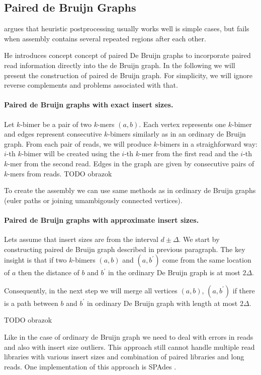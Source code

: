 \subsection{Paired de Bruijn Graphs}

\citet{Paired} argues that heuristic postprocessing
usually works well is simple cases, but fails when assembly contains
several repeated regions after each other.

He introduces concept concept of paired De Bruijn graphs to incorporate paired read
information directly into the de Bruijn graph.
In the following we will present the construction of 
paired de Bruijn graph.
For simplicity, we will ignore reverse complements and problems associated with that.

\paragraph{Paired de Bruijn graphs with exact insert sizes.}
Let $k$-bimer be a pair of two $k$-mers $(a, b)$. Each vertex 
represents one $k$-bimer and edges represent
consecutive $k$-bimers similarly as in an ordinary de Bruijn graph. 
From each pair of reads, we will produce $k$-bimers in a straighforward way:
$i$-th $k$-bimer will be created using the $i$-th $k$-mer from the first read and 
the $i$-th $k$-mer from the second read.
Edges in the graph are given by consecutive pairs of $k$-mers from reads.
TODO obrazok

To create the assembly we can use same methods as in ordinary de Bruijn graphs
(euler paths or joining umambigously connected vertices).

\paragraph{Paired de Bruijn graphs with approximate insert sizes.}
Lets assume that insert sizes are from the interval $d \pm \Delta$.
We start by constructing paired de Bruijn graph described in previous paragraph.
The key insight is that if two $k$-bimers $(a, b)$ and $(a, b^{'})$ come from
the same location of $a$ then the distance of $b$ and $b^{'}$ in the ordinary De Bruijn graph is at most $2\Delta$.

Consequently, in the next step we will merge all vertices $(a, b)$, $(a, b^{'})$ if there is a path
between $b$ and $b^{'}$ in ordinary De Bruijn graph with length at most $2\Delta$.

TODO obrazok

\bigskip
Like in the case of ordinary de Bruijn graph we need to deal with errors in reads
and also with insert size outliers. This approach still cannot handle multiple
read libraries with various insert sizes and combination of paired libraries and long reads.
One implementation of this approach is SPAdes \citep{(Spades}.



